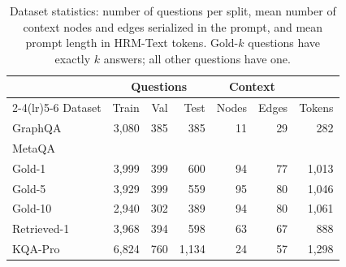 \begin{table}[t]
\centering
\footnotesize
\setlength{\tabcolsep}{2.5pt}
\begin{tabular}{@{}l rrr rr r@{}}
\toprule
 & \multicolumn{3}{c}{\textbf{Questions}} & \multicolumn{2}{c}{\textbf{Context}} & \\
\cmidrule(lr){2-4}\cmidrule(lr){5-6}
Dataset & Train & Val & Test & Nodes & Edges & Tokens \\
\midrule
GraphQA & 3,080 & 385 & 385 & 11 & 29 & 282 \\
MetaQA & & & & & & \\
\hspace{0.6em}Gold-1 & 3,999 & 399 & 600 & 94 & 77 & 1,013 \\
\hspace{0.6em}Gold-5 & 3,929 & 399 & 559 & 95 & 80 & 1,046 \\
\hspace{0.6em}Gold-10 & 2,940 & 302 & 389 & 94 & 80 & 1,061 \\
\hspace{0.6em}Retrieved-1 & 3,968 & 394 & 598 & 63 & 67 & 888 \\
KQA-Pro & 6,824 & 760 & 1,134 & 24 & 57 & 1,298 \\
\bottomrule
\end{tabular}
\caption{Dataset statistics: number of questions per split, mean number of context nodes and edges serialized in the prompt, and mean prompt length in HRM-Text tokens. Gold-$k$ questions have exactly $k$ answers; all other questions have one.}
\label{tab:dataset_stats_column}
\end{table}
